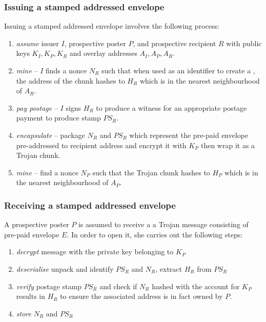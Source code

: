 \subsubsection{Issuing a stamped addressed envelope}

Issuing a stamped addressed envelope involves the following process:

\begin{enumerate}
\item \emph{assume} issuer $I$, prospective poster $P$, and prospective recipient $R$ with public keys $K_I, K_P, K_R$ and overlay addresses $A_I, A_P, A_R$.
\item \emph{mine} -- $I$ finds a nonce $N_R$ such that when used as an identifier to create a , the  address of the chunk hashes to $H_R$ which is in the nearest neighbourhood of $A_R$.
\item \emph{pay postage} -- $I$ signs $H_R$ to produce a witness for an appropriate postage payment to produce stamp $PS_R$.
\item \emph{encapsulate} -- package $N_R$ and $PS_R$ which represent the pre-paid envelope pre-addressed to recipient address and encrypt it with $K_P$ then wrap it as a Trojan chunk.
\item \emph{mine} -- find a nonce $N_P$ such that the Trojan chunk hashes to $H_P$ which is in the nearest neighbourhood of $A_P$. 
\end{enumerate}




\subsubsection{Receiving a stamped addressed envelope}

A prospective poster $P$ is assumed to receive a a Trojan message consisting of pre-paid envelope $E$. In order to open it, she carries out the following steps:

\begin{enumerate}
    \item \emph{decrypt} message with the private key belonging to $K_P$
    \item \emph{deserialise} unpack and identify $PS_R$ and $N_R$, extract $H_R$ from $PS_R$
    \item \emph{verify} postage stamp $PS_R$ and check if $N_R$ hashed with the account for $K_P$ results in $H_R$ to ensure the associated address is in fact owned by $P$.
    \item \emph{store} $N_R$ and $PS_R$ 
\end{enumerate}

